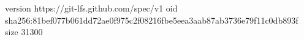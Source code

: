 version https://git-lfs.github.com/spec/v1
oid sha256:81bef077b061dd72ae0f975c2f08216fbe5eea3aab87ab3736e79f11c0db893f
size 31300

